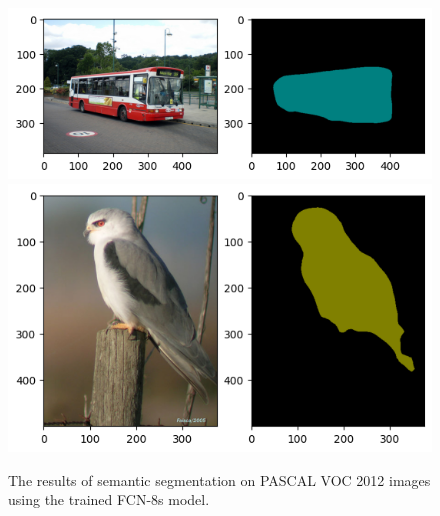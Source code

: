\documentclass[extendedabs]{bmvc2k}
\begin{document}
\begin{figure}[t]
    \includegraphics[width=0.7\linewidth]{images/result/result11.png}
    \includegraphics[width=0.7\linewidth]{images/result/result12.png}
    
	\caption{
		The results of semantic segmentation on PASCAL VOC 2012 images using the trained FCN-8s model. }
        \label{fig:inferresult2}
	\vspace{-2mm}
\end{figure}
\end{document}
